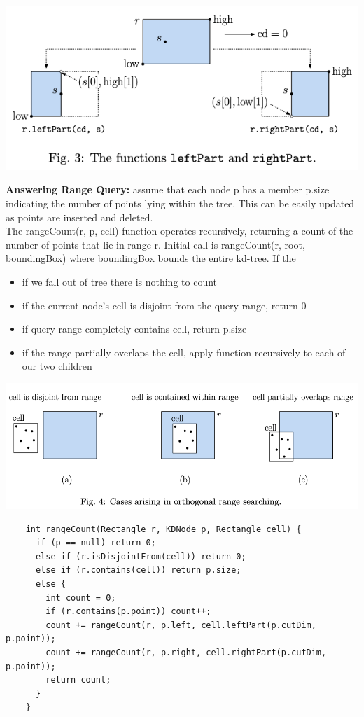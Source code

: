\documentclass{article}
\begin{document}
  \begin{center}
    \includegraphics[scale=0.4]{RangeQueriesLeftPart}
  \end{center}
  \newpage
  \noindent \textbf{Answering Range Query: }assume that each node p has a member p.size indicating the number of points lying within the tree. This can be easily updated as points are inserted and deleted. \\
  The rangeCount(r, p, cell) function operates recursively, returning a count of the number of points that lie in range r. Initial call is rangeCount(r, root, boundingBox) where boundingBox bounds the entire kd-tree. If the 
  \begin{itemize}[noitemsep]
    \item if we fall out of tree there is nothing to count
    \item if the current node's cell is disjoint from the query range, return 0
    \item if query range completely contains cell, return p.size
    \item if the range partially overlaps the cell, apply function recursively to each of our two children
  \end{itemize}
  \begin{center}
  \includegraphics[scale=0.4]{RangeCount}
  \end{center}
  \begin{lstlisting}
    int rangeCount(Rectangle r, KDNode p, Rectangle cell) {
      if (p == null) return 0;
      else if (r.isDisjointFrom(cell)) return 0;
      else if (r.contains(cell)) return p.size;
      else {
        int count = 0;
        if (r.contains(p.point)) count++;
        count += rangeCount(r, p.left, cell.leftPart(p.cutDim, p.point));
        count += rangeCount(r, p.right, cell.rightPart(p.cutDim, p.point));
        return count;
      }
    }
  \end{lstlisting}
\end{document}
